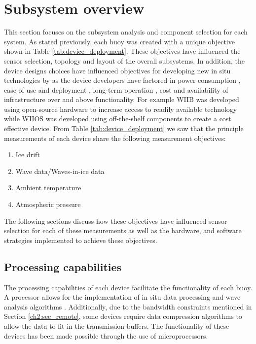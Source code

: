 \section{Subsystem overview}

This section focuses on the subsystem analysis and component selection for each system. As stated previously, each buoy was created with a unique objective shown in Table \ref{tab:device_deployment}. These objectives have influenced the sensor selection, topology and layout of the overall subsystems. In addition, the device designs choices have influenced objectives for developing new in situ technologies by \textcite{kennicutt2016delivering} as the device developers have factored in power consumption \cite{kohout2015device}, ease of use and deployment \cite{rabault2019open}, long-term operation \cite{doble2017robust}, cost \cite{planck2019evolution,rabault2019open} and availability of infrastructure \cite{doble2017robust} over and above functionality. For example WIIB was developed using open-source hardware \cite{rabault2019open} to increase access to readily available technology while WIIOS was developed using off-the-shelf components \cite{kohout2015device} to create a cost effective device. From Table \ref{tab:device_deployment} we saw that the principle measurements of each device share the following measurement objectives:

\begin{enumerate}
	\item Ice drift
	\item Wave data/Waves-in-ice data
	\item Ambient temperature
	\item Atmospheric pressure 
\end{enumerate}

The following sections discuss how these objectives have influenced sensor selection for each of these measurements as well as the hardware, and software strategies implemented to achieve these objectives.

\subsection{Processing capabilities}

The processing capabilities of each device facilitate the functionality of each buoy. A processor allows for the implementation of in situ data processing and wave analysis algorithms \cite{kohout2015device,rabault2019open}. Additionally, due to the bandwidth constraints mentioned in Section \ref{ch2:sec_remote}, some devices require data compression algorithms to allow the data to fit in the transmission buffers. The functionality of these devices has been made possible through the use of microprocessors.


